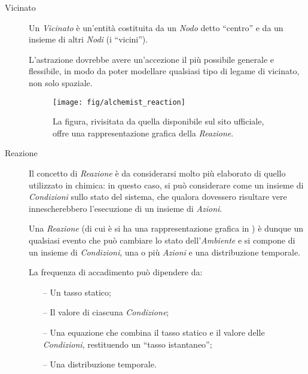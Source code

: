 \begin{description}
                \item[Vicinato]\label{itm:neigh}
                    Un \emph{Vicinato} è un'entità costituita da un \emph{Nodo} detto ``centro'' e da un insieme di altri \emph{Nodi} (i ``vicini'').

                    L'astrazione dovrebbe avere un'accezione il più possibile generale e flessibile, in modo da poter modellare qualsiasi tipo di legame di vicinato, non solo spaziale.

                    \begin{figure}[htbp]
                        \centering
                        \texttt{[image: fig/alchemist\_reaction]}
                        \caption{%
                            La figura, rivisitata da quella disponibile sul sito ufficiale, offre una rappresentazione grafica della \emph{Reazione}.
                        }
                        \label{fig:react}
                    \end{figure}

                \item[Reazione]\label{itm:react}
                    Il concetto di \emph{Reazione} è da considerarsi molto più elaborato di quello utilizzato in chimica:
                    in questo caso, si può considerare come un insieme di \emph{Condizioni} sullo stato del sistema, che qualora dovessero risultare vere innescherebbero l'esecuzione di un insieme di \emph{Azioni}.

                    Una \emph{Reazione} (di cui è si ha una rappresentazione grafica in ) è dunque un qualsiasi evento che può cambiare lo stato dell'\emph{Ambiente} e si compone di un insieme di \emph{Condizioni}, una o più \emph{Azioni} e una distribuzione temporale.

                    La frequenza di accadimento può dipendere da:
                    \begin{itemize}
                        \item[--] Un tasso statico;
                        \item[--] Il valore di ciascuna \emph{Condizione};
                        \item[--] Una equazione che combina il tasso statico e il valore delle \emph{Condizioni}, restituendo un ``tasso istantaneo'';
                        \item[--] Una distribuzione temporale.
                    \end{itemize}


\end{description}
